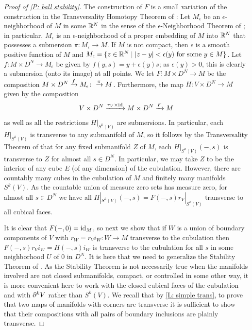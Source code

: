 \begin{proof}[Proof of \cref{P: ball stability}]
The construction of $F$ is a small variation of the construction in the Transversality Homotopy Theorem of \cite[Section 2.3]{GuPo74}:
Let $M_\epsilon$ be an $\epsilon$-neighborhood of $M$ in some $\mathbb{R}^N$ in the sense of the $\epsilon$-Neighborhood Theorem of \cite[Section 2.3]{GuPo74}; in particular,
$M_\epsilon$ is an $\epsilon$-neighborhood of a proper embedding of $M$ into $\mathbb{R}^N$ that possesses a submersion $\pi: M_\epsilon \to M$. If $M$ is not compact, then $\epsilon$ is a smooth positive function of $M$ and $M_\epsilon = \{z \in \mathbb{R}^N \mid |z-y|<\epsilon(y) \text{ for some }y \in M\}$. Let $f: M \times D^N \to M_\epsilon$ be given by $f(y, s) = y + \epsilon(y) s$; as $\epsilon(y)>0$, this is clearly a submersion (onto its image) at all points.
We let $F \colon M \times D^N \to M$ be the composition $M \times D^N \xrightarrow{f}M_\epsilon\colon\xrightarrow{\pi}M$.
Furthermore, the map $H \colon V \times D^N \to M$ given by the composition $$V \times D^N \xrightarrow{r_V \times \mathrm{id}} M \times D^N \xrightarrow{F} M$$ as well as all the restrictions $H|_{S^k(V)}$
are submersions.
In particular, each $H|_{S^k(V)}$ is transverse to any submanifold of $M$, so it follows by the Transversality Theorem of \cite[Section 2.3]{GuPo74} that for any fixed submanifold $Z$ of $M$, each $H|_{S^k(V)}(-,s)$ is transverse to $Z$ for almost all $s \in D^N$. In particular, we may take $Z$ to be the interior of any cube $E$ (of any dimension) of the cubulation. However, there are countably many cubes in the cubulation of $M$ and finitely many manifolds $S^k(V)$. As the countable union of measure zero sets has measure zero, for almost all $s \in D^N$ we have all $H|_{S^k(V)}(-,s) = F(-,s)r_V|_{S^k(V)}$ transverse to all cubical faces.

It is clear that $F(-,0) = \mathrm{id}_M$, so next we show that if $W$ is a union of boundary components of $V$ with $r_W = r_Vi_W \colon W \to M$ transverse to the cubulation then $F(-,s)r_Vi_W = H(-,s)i_W$ is transverse to the cubulation for all $s$ in some neighborhood $U$ of $0$ in $D^N$. It is here that we need to generalize the Stability Theorem of \cite[Section 1.6]{GuPo74}. As the Stability Theorem is not necessarily true when the manifolds involved are not closed submanifolds, compact, or controlled in some other way, it is more convenient here to work with the closed cubical faces of the cubulation and with $\partial^kV$ rather than $S^k(V)$. We recall that by \cref{L: simple trans}, to prove that two maps of manifolds with corners are transverse it is sufficient to show that their compositions with all pairs of boundary inclusions are plainly transverse.



\end{proof}
